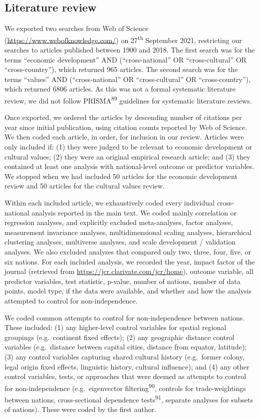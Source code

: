 \documentclass[
  man,floatsintext]{apa6}
\begin{document}
\hypertarget{literature-review}{%
\subsection{Literature review}\label{literature-review}}

We exported two searches from Web of Science (\url{https://www.webofknowledge.com/}) on 27\textsuperscript{th} September 2021, restricting our searches to articles published between 1900 and 2018. The first search was for the terms ``economic development'' AND (``cross-national'' OR ``cross-cultural'' OR ``cross-country''), which returned 965 articles. The second search was for the terms ``values'' AND (``cross-national'' OR ``cross-cultural'' OR ``cross-country''), which returned 6806 articles. As this was not a formal systematic literature review, we did not follow PRISMA\textsuperscript{89} guidelines for systematic literature reviews.

Once exported, we ordered the articles by descending number of citations per year since initial publication, using citation counts reported by Web of Science. We then coded each article, in order, for inclusion in our review. Articles were only included if: (1) they were judged to be relevant to economic development or cultural values; (2) they were an original empirical research article; and (3) they contained at least one analysis with national-level outcome or predictor variables. We stopped when we had included 50 articles for the economic development review and 50 articles for the cultural values review.

Within each included article, we exhaustively coded every individual cross-national analysis reported in the main text. We coded mainly correlation or regression analyses, and explicitly excluded meta-analyses, factor analyses, measurement invariance analyses, multidimensional scaling analyses, hierarchical clustering analyses, multiverse analyses, and scale development / validation analyses. We also excluded analyses that compared only two, three, four, five, or six nations. For each included analysis, we recorded the year, impact factor of the journal (retrieved from \url{https://jcr.clarivate.com/jcr/home}), outcome variable, all predictor variables, test statistic, p-value, number of nations, number of data points, model type, if the data were available, and whether and how the analysis attempted to control for non-independence.

We coded common attempts to control for non-independence between nations. These included: (1) any higher-level control variables for spatial regional groupings (e.g.~continent fixed effects); (2) any geographic distance control variables (e.g.~distance between capital cities, distance from equator, latitude); (3) any control variables capturing shared cultural history (e.g.~former colony, legal origin fixed effects, linguistic history, cultural influence); and (4) any other control variables, tests, or approaches that were deemed as attempts to control for non-independence (e.g.~eigenvector filtering\textsuperscript{90}, controls for trade-weightings between nations, cross-sectional dependence tests\textsuperscript{91}, separate analyses for subsets of nations). These were coded by the first author.
\end{document}
